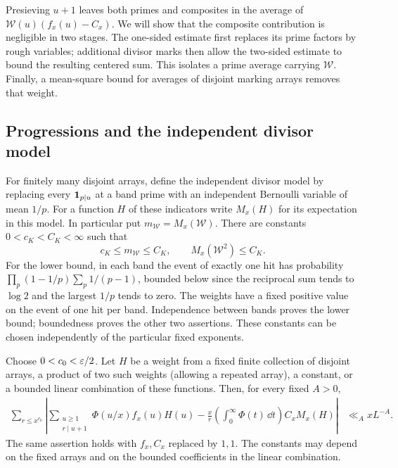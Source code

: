 Presieving $u+1$ leaves both primes and composites in the average of
$\mathcal W(u)(f_x(u)-C_x)$.  We will show that the composite
contribution is negligible in two stages.  The one-sided estimate
first replaces its prime factors by rough variables; additional
divisor marks then allow the two-sided estimate to bound the resulting
centered sum.  This isolates a prime average carrying $\mathcal W$.
Finally, a mean-square bound for averages of disjoint marking arrays
removes that weight.

\subsection{Progressions and the independent divisor model}

For finitely many disjoint arrays, define the independent divisor
model by replacing every $\mathbf{1}_{p\mid u}$ at a band prime with an
independent Bernoulli variable of mean $1/p$.  For a function $H$
of these indicators write $M_x(H)$ for its expectation in this
model.  In particular put $m_{\mathcal W}=M_x(\mathcal W)$.
There are constants $0<c_K<C_K<\infty$ such that
\begin{equation}\label{ext:model-bounds}
 c_K\leq m_{\mathcal W}\leq C_K,
 \qquad M_x(\mathcal W^2)\leq C_K.
\end{equation}
For the lower bound, in each band the event of exactly one hit has
probability
$\prod_p(1-1/p)\sum_p1/(p-1)$, bounded below since the reciprocal
sum tends to $\log2$ and the largest $1/p$ tends to zero.
The weights have a fixed positive value on the event of one hit
per band.  Independence between bands proves the lower bound;
boundedness proves the other two assertions.  These constants
can be chosen independently of the particular fixed exponents.

\begin{lemma}\label{lem:progressions}
Choose $0<c_0<\varepsilon/2$.  Let $H$ be a weight from a fixed finite
collection of disjoint arrays, a product of two such weights
(allowing a repeated array), a constant, or a bounded linear
combination of these functions.  Then, for every fixed $A>0$,
\begin{align}\label{ext:progression}
 \sum_{r\leq x^{c_0}}\left|
  \sum_{\substack{u\geq1\\r\mid u+1}}
             \Phi(u/x)f_x(u)H(u)
  -\frac{x}{r}\left(\int_0^\infty\Phi(t)\,\dd t\right)
                     C_x M_x(H)\right|
  &\ll_A xL^{-A}.
\end{align}
The same assertion holds with $f_x,C_x$ replaced by $1,1$.
The constants may depend on the fixed arrays and on the bounded
coefficients in the linear combination.
\end{lemma}

